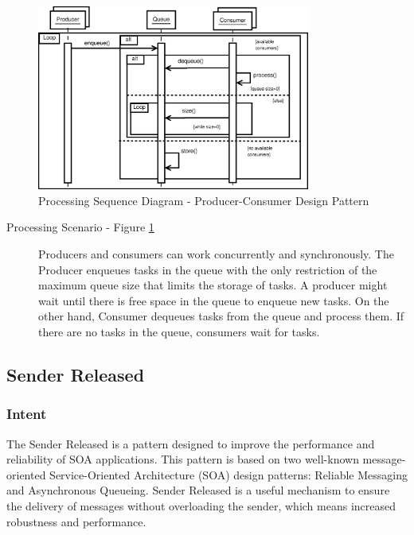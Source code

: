 \begin{figure}
	\centering
	\includegraphics*[width=0.8\textwidth, keepaspectratio=false]{fig/image13.eps}
	\caption{Processing Sequence Diagram - Producer-Consumer Design Pattern}
	\label{fig:seq_diagram_pc}
\end{figure}


\begin{description}
	
	\item[Processing Scenario - Figure \ref{fig:seq_diagram_pc}]
	
	Producers and consumers can work concurrently and synchronously. The Producer enqueues tasks in the queue with the only restriction of the maximum queue size that limits the storage of tasks. A producer might wait until there is free space in the queue to enqueue new tasks. On the other hand, Consumer dequeues tasks from the queue and process them. If there are no tasks in the queue, consumers wait for tasks.
\end{description}

\subsection{Sender Released}

\subsubsection{Intent}

The Sender Released is a pattern designed to improve the performance and reliability of SOA applications. This pattern is based on two well-known message-oriented Service-Oriented Architecture (SOA) design patterns: Reliable Messaging and Asynchronous Queueing. Sender Released is a useful mechanism to ensure the delivery of messages without overloading the sender, which means increased robustness and performance. \\

